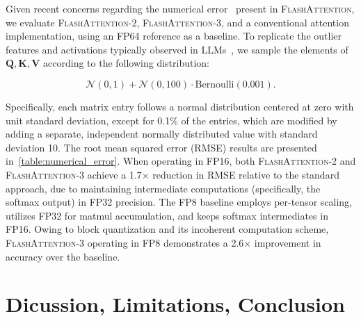 Given recent concerns regarding the numerical error~\citep{golden2024flash} present in \textsc{FlashAttention}, we evaluate \textsc{FlashAttention-2}, \textsc{FlashAttention-3}, and a conventional attention implementation, using an FP64 reference as a baseline. To replicate the outlier features and activations typically observed in LLMs~\citep{dettmers2208llm, sun2024massive}, we sample the elements of $\mathbf{Q}, \mathbf{K}, \mathbf{V}$ according to the following distribution:

\begin{equation*}
  \mathcal{N}(0, 1) + \mathcal{N}(0, 100) \cdot \mathrm{Bernoulli}(0.001).
\end{equation*}

Specifically, each matrix entry follows a normal distribution centered at zero with unit standard deviation, except for 0.1\% of the entries, which are modified by adding a separate, independent normally distributed value with standard deviation 10. The root mean squared error (RMSE) results are presented in~\cref{table:numerical_error}. When operating in FP16, both \textsc{FlashAttention-2} and \textsc{FlashAttention-3} achieve a 1.7$\times$ reduction in RMSE relative to the standard approach, due to maintaining intermediate computations (specifically, the softmax output) in FP32 precision. The FP8 baseline employs per-tensor scaling, utilizes FP32 for matmul accumulation, and keeps softmax intermediates in FP16. Owing to block quantization and its incoherent computation scheme, \textsc{FlashAttention-3} operating in FP8 demonstrates a 2.6$\times$ improvement in accuracy over the baseline.

\section{Dicussion, Limitations, Conclusion}
\label{sec:discussion}

